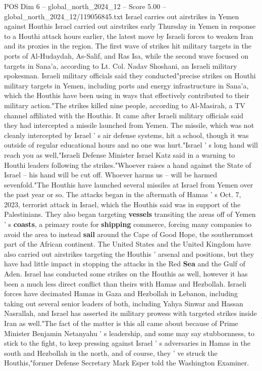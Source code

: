 \begin{textsample}{POS Dim 6 – global\_north\_2024\_12 – Score 5.00 – global\_north\_2024\_12/119056845.txt}  \label{ex:f6_pos_268}
Israel carries out airstrikes in Yemen against Houthis Israel carried out airstrikes early Thursday in Yemen in response to a Houthi attack hours earlier, the latest move by Israeli forces to weaken Iran and its proxies in the region.
The first wave of strikes hit military targets in the ports of Al-Hudaydah, As-Salif, and Ras Isa, while the second wave focused on targets in Sana'a, according to Lt.
Col.
Nadav Shoshani, an Israeli military spokesman.
Israeli military officials said they conducted"precise strikes on Houthi military targets in Yemen, including ports and energy infrastructure in Sana'a, which the Houthis have been using in ways that effectively contributed to their military action."The strikes killed nine people, according to Al-Masirah, a TV channel affiliated with the Houthis.
It came after Israeli military officials said they had intercepted a missile launched from Yemen.
The missile, which was not cleanly intercepted by Israel ' s air defense systems, hit a school, though it was outside of regular educational hours and no one was hurt."Israel ' s long hand will reach you as well,"Israeli Defense Minister Israel Katz said in a warning to Houthi leaders following the strikes."Whoever raises a hand against the State of Israel -- his hand will be cut off.
Whoever harms us -- will be harmed sevenfold."The Houthis have launched several missiles at Israel from Yemen over the past year or so.
The attacks began in the aftermath of Hamas ' s Oct. 7, 2023, terrorist attack in Israel, which the Houthis said was in support of the Palestinians.
They also began targeting \textbf{vessels} transiting the areas off of Yemen ' s \textbf{coasts}, a primary route for \textbf{shipping} commerce, forcing many companies to avoid the area to instead \textbf{sail} around the Cape of Good Hope, the southernmost part of the African continent.
The United States and the United Kingdom have also carried out airstrikes targeting the Houthis ' arsenal and positions, but they have had little impact in stopping the attacks in the Red \textbf{Sea} and the Gulf of Aden.
Israel has conducted some strikes on the Houthis as well, however it has been a much less direct conflict than theirs with Hamas and Hezbollah.
Israeli forces have decimated Hamas in Gaza and Hezbollah in Lebanon, including taking out several senior leaders of both, including Yahya Sinwar and Hassan Nasrallah, and Israel has asserted its military prowess with targeted strikes inside Iran as well."The fact of the matter is this all came about because of Prime Minister Benjamin Netanyahu ' s leadership, and some may say stubbornness, to stick to the fight, to keep pressing against Israel ' s adversaries in Hamas in the south and Hezbollah in the north, and of course, they ' ve struck the Houthis,"former Defense Secretary Mark Esper told the Washington Examiner.

\end{textsample}
